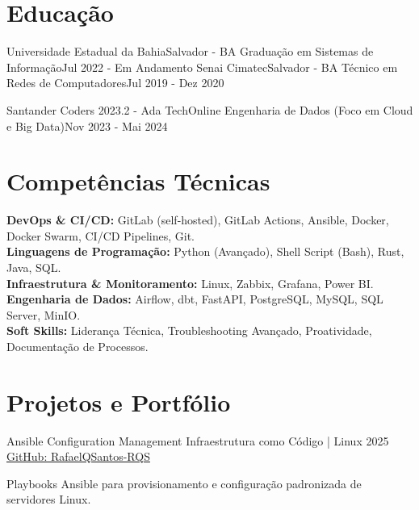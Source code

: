 \resumeSubHeadingListEnd
\vspace{-8.5mm}

\section{\textbf{Educação}}
\resumeSubHeadingListStart
\resumeSubheading
{Universidade Estadual da Bahia}{Salvador - BA}
{Graduação em Sistemas de Informação}{Jul 2022 - Em Andamento}
\resumeSubheading
{Senai Cimatec}{Salvador - BA}
{Técnico em Redes de Computadores}{Jul 2019 - Dez 2020}

\resumeSubheading
{Santander Coders 2023.2 - Ada Tech}{Online}
{Engenharia de Dados (Foco em Cloud e Big Data)}{Nov 2023 - Mai 2024}
\resumeSubHeadingListEnd
\vspace{-5.5mm}

\section{\textbf{Competências Técnicas}}
\begin{itemize}[leftmargin=0.1in, label={}]
	\small{\item{
	      \textbf{DevOps \& CI/CD:}{ GitLab (self-hosted), GitLab Actions, Ansible, Docker, Docker Swarm, CI/CD Pipelines, Git.} \\
	      \textbf{Linguagens de Programação:}{ Python (Avançado), Shell Script (Bash), Rust, Java, SQL.} \\
	      \textbf{Infraestrutura \& Monitoramento:}{ Linux, Zabbix, Grafana, Power BI.} \\
	      \textbf{Engenharia de Dados:}{ Airflow, dbt, FastAPI, PostgreSQL, MySQL, SQL Server, MinIO.} \\
	      \textbf{Soft Skills:}{ Liderança Técnica, Troubleshooting Avançado, Proatividade, Documentação de Processos.} \\
	      }}
\end{itemize}
\vspace{-16pt}


\section{\textbf{Projetos e Portfólio}}
\resumeSubHeadingListStart

\resumeProject
{Ansible Configuration Management}
{Infraestrutura como Código | Linux}
{2025}
{\href{https://github.com/RafaelQSantos-RQS}{GitHub: RafaelQSantos-RQS}}
\resumeItemListStart
\item {Playbooks Ansible para provisionamento e configuração padronizada de servidores Linux.}
\resumeItemListEnd

